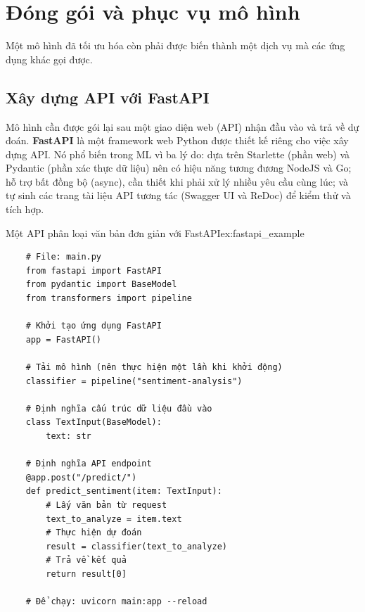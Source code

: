 
\section{Đóng gói và phục vụ mô hình}
\label{sec:packaging_serving}
Một mô hình đã tối ưu hóa còn phải được biến thành một dịch vụ mà các ứng dụng khác gọi được.

\subsection{Xây dựng API với FastAPI}
\label{ssec:fastapi}
Mô hình cần được gói lại sau một giao diện web (API) nhận đầu vào và trả về dự đoán. \textbf{FastAPI} là một framework web Python được thiết kế riêng cho việc xây dựng API. Nó phổ biến trong ML vì ba lý do: dựa trên Starlette (phần web) và Pydantic (phần xác thực dữ liệu) nên có hiệu năng tương đương NodeJS và Go; hỗ trợ bất đồng bộ (async), cần thiết khi phải xử lý nhiều yêu cầu cùng lúc; và tự sinh các trang tài liệu API tương tác (Swagger UI và ReDoc) để kiểm thử và tích hợp.
\begin{example}{Một API phân loại văn bản đơn giản với FastAPI}{ex:fastapi_example}
    \begin{verbatim}
    # File: main.py
    from fastapi import FastAPI
    from pydantic import BaseModel
    from transformers import pipeline

    # Khởi tạo ứng dụng FastAPI
    app = FastAPI()

    # Tải mô hình (nên thực hiện một lần khi khởi động)
    classifier = pipeline("sentiment-analysis")

    # Định nghĩa cấu trúc dữ liệu đầu vào
    class TextInput(BaseModel):
        text: str

    # Định nghĩa API endpoint
    @app.post("/predict/")
    def predict_sentiment(item: TextInput):
        # Lấy văn bản từ request
        text_to_analyze = item.text
        # Thực hiện dự đoán
        result = classifier(text_to_analyze)
        # Trả về kết quả
        return result[0]

    # Để chạy: uvicorn main:app --reload
    \end{verbatim}
\end{example}

